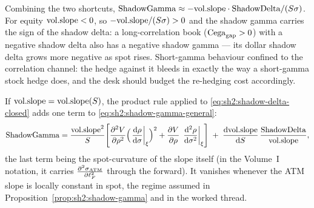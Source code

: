 \begin{remark}\label{rem:sh2:gamma-delta}
Combining the two shortcuts,
$\mathrm{ShadowGamma} \approx -\mathrm{vol.slope} \cdot \mathrm{ShadowDelta} / (S \sigma)$. For
equity $\mathrm{vol.slope} < 0$, so $-\mathrm{vol.slope}/(S\sigma) > 0$ and the shadow gamma
carries the sign of the shadow delta: a long-correlation book
($\mathrm{Cega}_{\mathrm{gap}} > 0$) with a negative shadow delta also has a negative shadow
gamma --- its dollar shadow delta grows more negative as spot rises.
Short-gamma behaviour confined to the correlation channel: the hedge
against it bleeds in exactly the way a short-gamma stock hedge does, and
the desk should budget the re-hedging cost accordingly.
\end{remark}

\begin{remark}\label{rem:sh2:slope-of-S}
If $\mathrm{vol.slope} = \mathrm{vol.slope}(S)$, the product rule applied to
\eqref{eq:sh2:shadow-delta-closed} adds one term to
\eqref{eq:sh2:shadow-gamma-general}:
\[
  \mathrm{ShadowGamma}
  = \frac{\mathrm{vol.slope}^2}{S}
    \Biggl[\frac{\partial^2 V}{\partial \rho^2}\Bigl(\left.\frac{\mathrm{d} \rho}{\mathrm{d} \sigma}\right|_{\xi}\Bigr)^2
    + \frac{\partial V}{\partial \rho}\,\left.\frac{\mathrm{d}^2\rho}{\mathrm{d}\sigma^2}\right|_{\xi}\Biggr]
  \;+\; \frac{\mathrm{d} \mathrm{vol.slope}}{\mathrm{d} S}\, \frac{\mathrm{ShadowDelta}}{\mathrm{vol.slope}},
\]
the last term being the spot-curvature of the slope itself (in the
Volume~I notation, it carries $\frac{\partial^2 \sigma_{\mathrm{ATM}}}{\partial \ell_F^2}$ through the forward). It
vanishes whenever the ATM slope is locally constant in spot, the regime
assumed in Proposition~\ref{prop:sh2:shadow-gamma} and in the worked
thread.
\end{remark}

